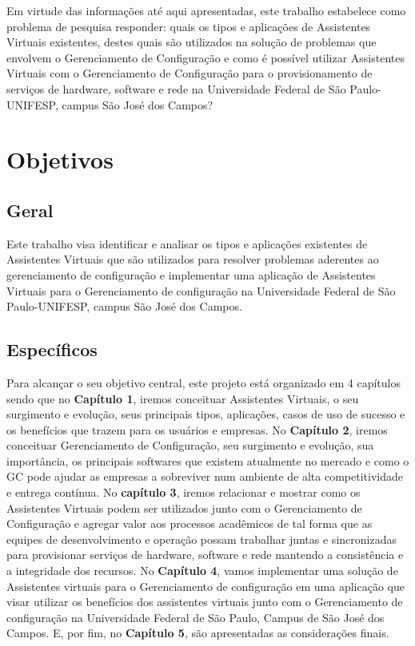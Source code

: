 \documentclass[quali]{mpit}
\begin{document}
Em virtude das informações até aqui apresentadas, este trabalho estabelece como problema de pesquisa responder: quais os tipos e aplicações de Assistentes Virtuais existentes,  destes quais são utilizados na solução de problemas que envolvem o Gerenciamento de Configuração e como é possível utilizar Assistentes Virtuais com o Gerenciamento de Configuração para o provisionamento de serviços de hardware, software e rede na Universidade Federal de São Paulo-UNIFESP, campus São José dos Campos?

\section{Objetivos}

\subsection{Geral}
Este trabalho visa identificar e analisar os tipos e aplicações existentes de Assistentes Virtuais que são utilizados para resolver problemas aderentes ao gerenciamento de configuração e implementar uma aplicação de Assistentes Virtuais para o Gerenciamento de configuração na Universidade Federal de São Paulo-UNIFESP, campus São José dos Campos.

\subsection{Específicos}
Para alcançar o seu objetivo central, este projeto está organizado em 4 capítulos sendo que no \textbf{Capítulo 1}, iremos conceituar Assistentes Virtuais, o seu surgimento e evolução, seus principais tipos, aplicações, casos de uso de sucesso e os benefícios que trazem para os usuários e empresas.
No \textbf{Capítulo 2}, iremos conceituar Gerenciamento de Configuração, seu surgimento e evolução, sua importância, os principais softwares que existem atualmente no mercado e como o GC pode ajudar as empresas a sobreviver num ambiente de alta competitividade e entrega contínua.
No \textbf{capítulo 3}, iremos relacionar e mostrar como os Assistentes Virtuais podem ser utilizados junto com o Gerenciamento de Configuração e agregar valor aos processos acadêmicos de tal forma que as equipes de desenvolvimento e operação possam trabalhar juntas e sincronizadas para provisionar serviços de hardware, software e rede mantendo a consistência e a integridade dos recursos. No \textbf{Capítulo 4}, vamos implementar uma solução de Assistentes virtuais para o Gerenciamento de configuração em uma aplicação que visar utilizar os benefícios dos assistentes virtuais junto com o Gerenciamento de configuração na Universidade Federal de São Paulo, Campus de São José dos Campos. E, por fim, no \textbf{Capítulo 5}, são apresentadas as considerações finais.
\end{document}
